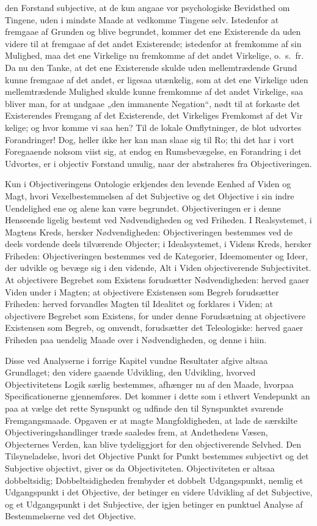 \documentclass[12pt]{book}
\newcommand{\opage}[1]{\marginnote{\footnotesize\textit{[#1]}}}
\begin{document}
den Forstand subjective, at de kun angaae vor psychologiske Bevidsthed om Tingene, uden i mindste Maade
at vedkomme Tingene selv. Istedenfor at fremgaae af Grunden og blive begrundet, kommer det ene
Existerende da uden videre til at fremgaae af det andet Existerende; istedenfor at fremkomme af sin
Mulighed, maa det ene Virkelige nu fremkomme af det andet Virkelige, o.\ s.\ fr. Da nu den Tanke, at
det ene Existerende skulde uden mellemtrædende Grund kunne fremgaae af det andet, er ligesaa utænkelig,
som at det ene Virkelige uden mellemtrædende Mulighed skulde kunne fremkomme af det andet Virkelige, saa
bliver man, for at undgaae „den immanente Negation“, nødt til at forkaste det Existerendes Fremgang af
det Existerende, det Virkeliges Fremkomst af det Vir%
\opage{272} kelige; og hvor komme vi saa hen? Til de lokale Omflytninger, de blot udvortes Forandringer! Dog,
heller ikke her kan man slaae sig til Ro; thi det har i vort Foregaaende noksom viist sig, at endog en
Rumsbevægelse, en Forandring i det Udvortes, er i objectiv Forstand umulig, naar der abstraheres fra
Objectiveringen.

Kun i Objectiveringens Ontologie erkjendes den levende Eenhed af Viden og Magt, hvori
Vexelbestemmelsen af det Subjective og det Objective i sin indre Uendelighed ene og alene kan være
begrundet. Objectiveringen er i denne Henseende ligelig bestemt ved Nødvendigheden og ved Friheden. I
Realsystemet, i Magtens Kreds, hersker Nødvendigheden: Objectiveringen bestemmes ved de deels vordende
deels tilværende Objecter; i Idealsystemet, i Videns Kreds, hersker Friheden: Objectiveringen bestemmes
ved de Kategorier, Ideemomenter og Ideer, der udvikle og bevæge sig i den vidende, Alt i Viden
objectiverende Subjectivitet. At objectivere Begrebet som Existens forudsætter Nødvendigheden: herved
gaaer Viden under i Magten; at objectivere Existensen som Begreb forudsætter Friheden: herved forvandles
Magten til Idealitet og forklares i Viden; at objectivere Begrebet som Existens, for under denne
Forudsætning at objectivere Existensen som Begreb, og omvendt, forudsætter det Teleologiske: herved
gaaer Friheden paa uendelig Maade over i Nødvendigheden, og denne i hiin.

Disse ved Analyserne i forrige Kapitel vundne Resultater afgive altsaa Grundlaget; den videre gaaende
Udvikling, den Udvikling, hvorved Objectivitetens Logik særlig bestemmes, afhænger nu af den Maade,
hvorpaa Specificationerne gjennemføres. Det kommer i dette som i ethvert Vendepunkt an paa at vælge det
rette Synspunkt og udfinde den til Synspunktet svarende Fremgangsmaade. Opgaven er at magte
Mangfoldigheden, at lade de særskilte Objectiveringshandlinger træde saaledes frem, at Andethedens
Væsen, Objecternes
\opage{273} Verden, kan blive tydeliggjort for den objectiverende Selvhed. Den Tilsyneladelse, hvori det Objective
Punkt for Punkt bestemmes subjectivt og det Subjective objectivt, giver os da Objectiviteten.
Objectiviteten er altsaa dobbeltsidig; Dobbeltsidigheden frembyder et dobbelt Udgangspunkt, nemlig et
Udgangspunkt i det Objective, der betinger en videre Udvikling af det Subjective, og et Udgangspunkt i
det Subjective, der igjen betinger en punktuel Analyse af Bestemmelserne ved det Objective.
\end{document}
